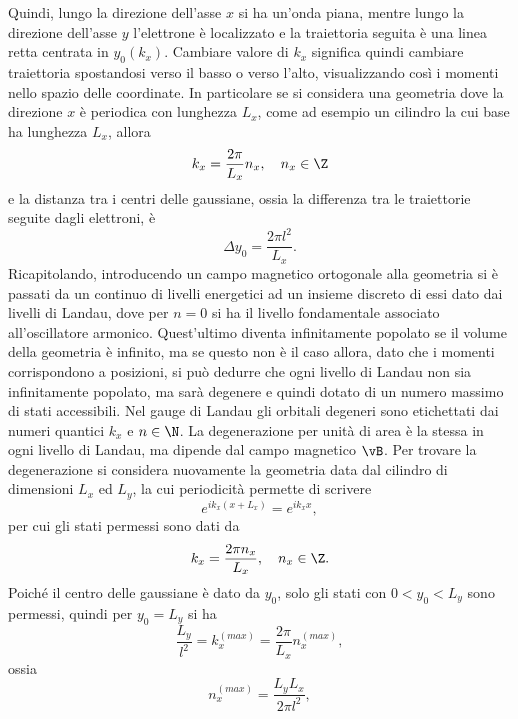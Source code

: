Quindi, lungo la direzione dell'asse $x$ si ha un'onda piana, mentre lungo la direzione dell'asse $y$ l'elettrone è localizzato e la traiettoria seguita è una linea retta centrata in $y_0(k_x)$. Cambiare valore di $k_x$ significa quindi cambiare traiettoria spostandosi verso il basso o verso l'alto, visualizzando così i momenti nello spazio delle coordinate. In particolare se si considera una geometria dove la direzione $x$ è periodica con lunghezza $L_x$, come ad esempio un cilindro la cui base ha lunghezza $L_x$, allora 
\begin{equation}
    k_x = \frac{2\pi}{L_x}n_x,\quad n_x \in \Z
\end{equation}
e la distanza tra i centri delle gaussiane, ossia la differenza tra le traiettorie seguite dagli elettroni, è 
\begin{equation}
    \Delta y_0 = \frac{2\pi l^2}{L_x}.
\end{equation}
Ricapitolando, introducendo un campo magnetico ortogonale alla geometria si è passati da un continuo di livelli energetici ad un insieme discreto di essi dato dai livelli di Landau, dove per $n = 0$ si ha il livello fondamentale associato all'oscillatore armonico. Quest'ultimo diventa infinitamente popolato se il volume della geometria è infinito, ma se questo non è il caso allora, dato che i momenti corrispondono a posizioni, si può dedurre che ogni livello di Landau non sia infinitamente popolato, ma sarà degenere e quindi dotato di un numero massimo di stati accessibili. Nel gauge di Landau gli orbitali degeneri sono etichettati dai numeri quantici $k_x$ e $n \in \N$. La degenerazione per unità di area è la stessa in ogni livello di Landau, ma dipende dal campo magnetico $\vB$. Per trovare la degenerazione si considera nuovamente la geometria data dal cilindro di dimensioni $L_x$ ed $L_y$, la cui periodicità permette di scrivere
\begin{equation}
    e^{ik_x(x + L_x)} = e^{ik_xx},
\end{equation}
per cui gli stati permessi sono dati da
\begin{equation}
    k_x = \frac{2\pi n_x}{L_x},\quad n_x \in \Z.
\end{equation}
Poiché il centro delle gaussiane è dato da $y_0$, solo gli stati con $0 < y_0 < L_y$ sono permessi, quindi per $y_0 = L_y$ si ha
\begin{equation}
    \frac{L_y}{l^2} = k_x^{(max)} = \frac{2\pi}{L_x}n_x^{(max)},
\end{equation}
ossia 
\begin{equation}
    n_x^{(max)} = \frac{L_yL_x}{2\pi l^2},
\end{equation}
